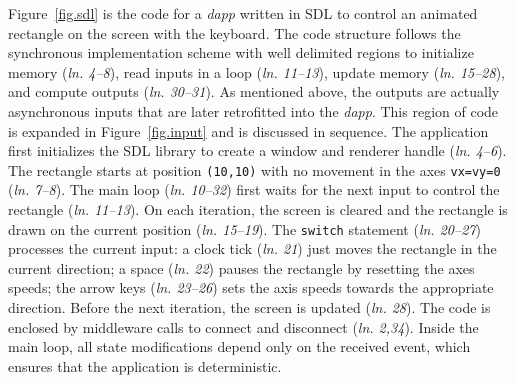 \documentclass[sigplan,screen]{acmart}
\newcommand{\lin}[1]{(\emph{ln. #1})}
\begin{document}
Figure~\ref{fig.sdl} is the code for a \emph{dapp} written in SDL to control an
animated rectangle on the screen with the keyboard.
The code structure follows the synchronous implementation scheme with well
delimited regions to initialize memory \lin{4--8}, read inputs in a loop
\lin{11--13}, update memory \lin{15--28}, and compute outputs \lin{30--31}.
As mentioned above, the outputs are actually asynchronous inputs that are later
retrofitted into the \emph{dapp}.
This region of code is expanded in Figure~\ref{fig.input} and is discussed in
sequence.
The application first initializes the SDL library to create a window and
renderer handle \lin{4--6}.
The rectangle starts at position \texttt{(10,10)} with no movement in the axes
\texttt{vx=vy=0} \lin{7--8}.
The main loop \lin{10--32} first waits for the next input to control the
rectangle \lin{11--13}.
On each iteration, the screen is cleared and the rectangle is drawn on the
current position \lin{15--19}.
The \texttt{switch} statement \lin{20--27} processes the current input:
    a clock tick \lin{21} just moves the rectangle in the current direction;
    a space \lin{22} pauses the rectangle by resetting the axes speeds;
    the arrow keys \lin{23--26} sets the axis speeds towards the appropriate direction.
Before the next iteration, the screen is updated \lin{28}.
The code is enclosed by middleware calls to connect and disconnect \lin{2,34}.
Inside the main loop, all state modifications depend only on the received
event, which ensures that the application is deterministic.
\end{document}
